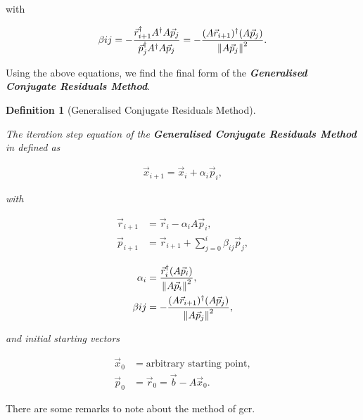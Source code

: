 \documentclass{article}
\theoremstyle{plain} %
\newtheorem{definition}{Definition}[section]
\theoremstyle{convention} %
\theoremstyle{remark} %
\def\df#1{\textbf{\textit{#1}}}
\numberwithin{equation}{section}
\begin{document}
with

\begin{align*}
    \beta{ij} = - \frac{ \vec{r}_{i+1}^{\dagger} A^{\dagger} A \vec{p}_j }{ \vec{p}_j^{\dagger} A^{\dagger} A \vec{p}_j } = - \frac{ (A \vec{r}_{i+1})^{\dagger} (A \vec{p}_j) }{ \norm{A \vec{p}_j}^2 }.
\end{align*}

Using the above equations, we find the final form of the \df{Generalised Conjugate Residuals Method}.

\begin{definition}[Generalised Conjugate Residuals Method]

\label{df:gcr}

The iteration step equation of the \df{Generalised Conjugate Residuals Method} in defined as

\begin{align}
    \vec{x}_{i+1} = \vec{x}_i + \alpha_i \vec{p}_i, \label{eq:gcr:step}
\end{align}

with

\noindent\begin{minipage}{.5\linewidth}
    \begin{align*}
        \vec{r}_{i+1} &= \vec{r}_{i}   - \alpha_i A  \vec{p}_i, \\
        \vec{p}_{i+1} &= \vec{r}_{i+1} + \sum_{j=0}^{i} \beta_{ij} \vec{p}_j, 
    \end{align*}
\end{minipage}
\begin{minipage}{.5\linewidth}
    \begin{align}
        \alpha_i  &=   \frac{ \vec{r}_i^{\dagger} (A \vec{p}_{i}) }{ \norm{A \vec{p}_i}^2 }, \label{eq:gcr:alpha} \\
        \beta{ij} &= - \frac{ (A \vec{r}_{i+1})^{\dagger} (A \vec{p}_j) }{ \norm{A \vec{p}_j}^2 },
    \end{align}
\end{minipage}

and initial starting vectors

\begin{align*}
    \vec{x}_{0} &= \text{arbitrary starting point}, \\
    \vec{p}_{0} &= \vec{r}_{0} = \vec{b} - A \vec{x}_0.
\end{align*}

\end{definition}

There are some remarks to note about the method of \acrshort{gcr}.
\end{document}
